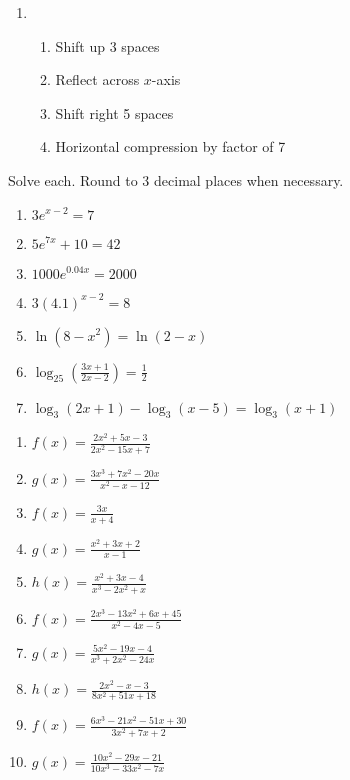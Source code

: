 \documentclass{article}
\newcounter{Review}
\begin{document}
\begin{enumerate}	\setcounter{enumi}{\value{Review}}
\item \begin{enumerate}[(1)]
\setlength\itemsep{0pt}
	\item Shift up 3 spaces
	\item Reflect across $x$-axis
	\item Shift right 5 spaces
	\item Horizontal compression by factor of 7
\end{enumerate}
\setcounter{Review}{\value{enumi}}
\end{enumerate}

Solve each. Round to 3 decimal places when necessary.
\begin{enumerate}   \setcounter{enumi}{\value{Review}}
	\item $3e^{x-2} = 7$
	\item $5e^{7x} + 10 = 42$
	\item $1000e^{0.04x} = 2000$
	\item $3(4.1)^{x-2} = 8$
	\item $\ln\left(8-x^2\right) = \ln(2-x)$
	\item $\log_{25}\left(\frac{3x+1}{2x-2}\right) = \frac{1}{2}$
	\item $\log_3(2x+1)-\log_3(x-5) = \log_3(x+1)$
\end{enumerate} 
\setcounter{Review}{\value{enumi}}

\begin{enumerate}   \setcounter{enumi}{\value{Review}}
\setlength\itemsep{10pt}
	\item $f(x) = \frac{2x^2+5x-3}{2x^2-15x+7}$
	\item $g(x) = \frac{3x^3+7x^2-20x}{x^2-x-12}$
	\item $f(x) = \frac{3x}{x+4}$
	\item $g(x) = \frac{x^2+3x+2}{x-1}$
	\item $h(x) = \frac{x^2+3x-4}{x^3-2x^2+x}$
	\item $f(x) = \frac{2x^3-13x^2+6x+45}{x^2-4x-5}$
	\item $g(x) = \frac{5x^2-19x-4}{x^3+2x^2-24x}$
	\item $h(x) = \frac{2x^2-x-3}{8x^2+51x+18}$
	\item $f(x) = \frac{6x^3 - 21x^2 - 51x + 30}{3x^2+7x+2}$
	\item $g(x) = \frac{10x^2-29x-21}{10x^3-33x^2-7x}$
\end{enumerate}	
\setcounter{Review}{\value{enumi}}
\end{document}
